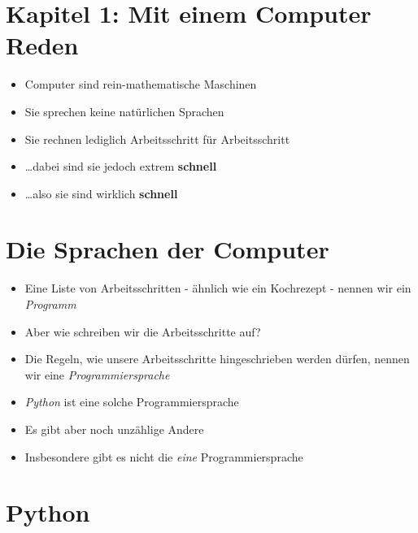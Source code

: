 \section{Kapitel 1: Mit einem Computer Reden}
\begin{frame}
    \slidehead
    \begin{itemize}[<+->]
        \item Computer sind rein-mathematische Maschinen
        \item Sie sprechen keine natürlichen Sprachen
        \item Sie rechnen lediglich Arbeitsschritt für Arbeitsschritt
        \item \dots dabei sind sie jedoch extrem \textbf{schnell}
        \vspace{3em}
        \item \dots also sie sind wirklich \textbf{\Huge schnell}
    \end{itemize}
\end{frame}

\section{Die Sprachen der Computer}
\begin{frame}
    \slidehead
    \begin{itemize}[<+->]
        \item Eine Liste von Arbeitsschritten - ähnlich wie ein Kochrezept - nennen wir ein \emph{Programm}
        \item Aber wie schreiben wir die Arbeitsschritte auf?
        \item Die Regeln, wie unsere Arbeitsschritte hingeschrieben werden dürfen, nennen wir eine \emph{Programmiersprache}
        \item \emph{Python} ist eine solche Programmiersprache
        \item Es gibt aber noch unzählige Andere
        \item Insbesondere gibt es nicht die \emph{eine} Programmiersprache
    \end{itemize}
\end{frame}

\section{Python}
